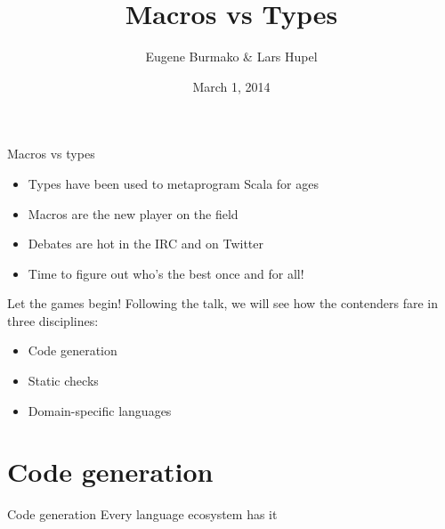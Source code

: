 \documentclass{beamer}
\begin{document}
  \title{Macros vs Types}
  \author{Eugene Burmako \& Lars Hupel}
  \date{March 1, 2014}

{
\begin{frame}
  \titlepage
\end{frame}
}

\begin{frame}{Macros vs types}
  \begin{itemize}
    \item Types have been used to metaprogram Scala for ages
    \item Macros are the new player on the field
    \item Debates are hot in the IRC and on Twitter
    \item Time to figure out who's the best once and for all!
  \end{itemize}
\end{frame}

\begin{frame}{Let the games begin!}
  Following the  talk, we will see how the contenders fare in three disciplines:

  \vspace{1em}
  \begin{itemize}
    \item Code generation
    \item Static checks
    \item Domain-specific languages
  \end{itemize}
\end{frame}


  \section{Code generation}


\begin{frame}[fragile]{Code generation}
  Every language ecosystem has it
\end{frame}
\end{document}
